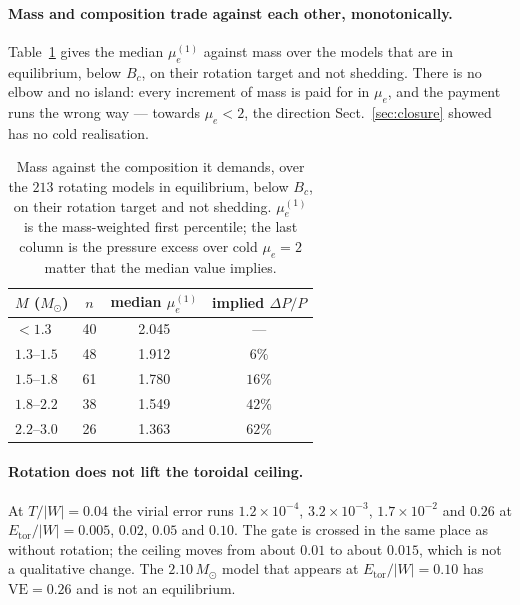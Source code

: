 \documentclass{aa}
\begin{document}
\paragraph{Mass and composition trade against each other, monotonically.}
Table~\ref{tab:trade} gives the median $\mu_e^{(1)}$ against mass over
the models that are in equilibrium, below $B_c$, on their rotation
target and not shedding. There is no elbow and no island: every increment
of mass is paid for in $\mu_e$, and the payment runs the wrong way ---
towards $\mu_e < 2$, the direction Sect.~\ref{sec:closure} showed has no
cold realisation.

\begin{table}
\caption{Mass against the composition it demands, over the $213$
         rotating models in equilibrium, below $B_c$, on their rotation
         target and not shedding. $\mu_e^{(1)}$ is the mass-weighted
         first percentile; the last column is the pressure excess over
         cold $\mu_e = 2$ matter that the median value implies.}
\label{tab:trade}
\centering
\begin{tabular}{lccc}
\hline\hline
$M$ ($M_\odot$) & $n$ & median $\mu_e^{(1)}$ & implied $\Delta P/P$ \\
\hline
$< 1.3$      & 40 & 2.045 & --- \\
$1.3$--$1.5$ & 48 & 1.912 & $6\%$ \\
$1.5$--$1.8$ & 61 & 1.780 & $16\%$ \\
$1.8$--$2.2$ & 38 & 1.549 & $42\%$ \\
$2.2$--$3.0$ & 26 & 1.363 & $62\%$ \\
\hline
\end{tabular}
\end{table}

\paragraph{Rotation does not lift the toroidal ceiling.} At
$T/|W| = 0.04$ the virial error runs $1.2\times10^{-4}$, $3.2\times
10^{-3}$, $1.7\times10^{-2}$ and $0.26$ at
$E_{\mathrm{tor}}/|W| = 0.005$, $0.02$, $0.05$ and $0.10$. The gate is
crossed in the same place as without rotation; the ceiling moves from
about $0.01$ to about $0.015$, which is not a qualitative change. The
$2.10\,M_\odot$ model that appears at $E_{\mathrm{tor}}/|W| = 0.10$ has
$\mathrm{VE} = 0.26$ and is not an equilibrium.
\end{document}
